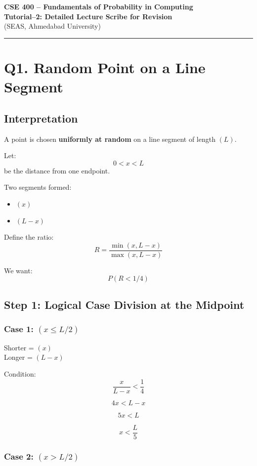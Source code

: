 \documentclass[12pt]{article}
\begin{document}
\begin{center}
\textbf{\Large CSE 400 – Fundamentals of Probability in Computing} \\[0.5em]
\textbf{Tutorial–2: Detailed Lecture Scribe for Revision} \\[0.5em]
(SEAS, Ahmedabad University)
\end{center}

\hrule
\vspace{1em}

\section*{Q1. Random Point on a Line Segment}

\subsection*{Interpretation}

A point is chosen \textbf{uniformly at random} on a line segment of length $(L)$.

Let:
\[
0 < x < L
\]
be the distance from one endpoint.

Two segments formed:

\begin{itemize}
\item $(x)$
\item $(L-x)$
\end{itemize}

Define the ratio:
\[
R = \frac{\min(x,L-x)}{\max(x,L-x)}
\]

We want:
\[
P(R < 1/4)
\]

\subsection*{Step 1: Logical Case Division at the Midpoint}

\subsubsection*{Case 1: $(x \le L/2)$}

Shorter = $(x)$ \\
Longer = $(L-x)$

Condition:
\[
\frac{x}{L-x} < \frac14
\]

\[
4x < L-x
\]

\[
5x < L
\]

\[
x < \frac{L}{5}
\]

\subsubsection*{Case 2: $(x > L/2)$}
\end{document}
